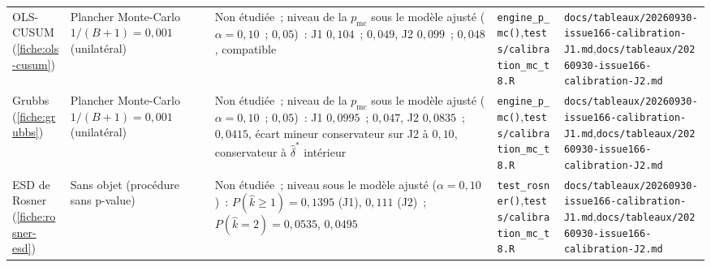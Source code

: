 \documentclass[a4paper,11pt]{article}
\newcommand{\code}[1]{\texttt{\small #1}}
\begin{document}
\begin{landscape}
\begin{center}
\begin{longtable}{@{}>{\raggedright\arraybackslash}p{2.5cm}>{\raggedright\arraybackslash}p{3.6cm}>{\raggedright\arraybackslash}p{4.0cm}>{\raggedright\arraybackslash}p{6.7cm}>{\raggedright\arraybackslash}p{7.2cm}@{}}
OLS-CUSUM (\ref{fiche:ols-cusum}) & Plancher Monte-Carlo $1/(B+1) = 0{,}001$ (unilatéral) & Non étudiée~; niveau de la $p_{\mathrm{mc}}$ sous le modèle ajusté ($\alpha = 0{,}10$~; $0{,}05$)~: J1 $0{,}104$~; $0{,}049$, J2 $0{,}099$~; $0{,}048$, compatible & \code{engine\_p\_mc()},\newline \code{tests/calibration\_mc\_t8.R} & \code{docs/tableaux/}\newline \code{20260930-issue166-calibration-J1.md},\newline \code{docs/tableaux/}\newline \code{20260930-issue166-calibration-J2.md} \\
Grubbs (\ref{fiche:grubbs}) & Plancher Monte-Carlo $1/(B+1) = 0{,}001$ (unilatéral) & Non étudiée~; niveau de la $p_{\mathrm{mc}}$ sous le modèle ajusté ($\alpha = 0{,}10$~; $0{,}05$)~: J1 $0{,}0995$~; $0{,}047$, J2 $0{,}0835$~; $0{,}0415$, écart mineur conservateur sur J2 à $0{,}10$, conservateur à $\hat\delta^{*}$ intérieur & \code{engine\_p\_mc()},\newline \code{tests/calibration\_mc\_t8.R} & \code{docs/tableaux/}\newline \code{20260930-issue166-calibration-J1.md},\newline \code{docs/tableaux/}\newline \code{20260930-issue166-calibration-J2.md} \\
ESD de Rosner (\ref{fiche:rosner-esd}) & Sans objet (procédure sans p-value) & Non étudiée~; niveau sous le modèle ajusté ($\alpha = 0{,}10$)~: $P(\hat k \ge 1) = 0{,}1395$ (J1), $0{,}111$ (J2)~; $P(\hat k = 2) = 0{,}0535$, $0{,}0495$ & \code{test\_rosner()},\newline \code{tests/calibration\_mc\_t8.R} & \code{docs/tableaux/}\newline \code{20260930-issue166-calibration-J1.md},\newline \code{docs/tableaux/}\newline \code{20260930-issue166-calibration-J2.md} \\

\end{longtable}
\end{center}
\end{landscape}
\end{document}
